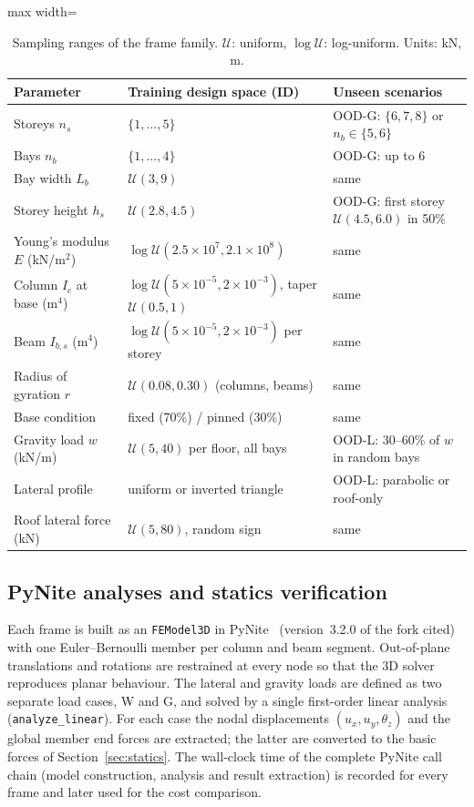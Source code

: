 \begin{table}[t]
\centering
\caption{Sampling ranges of the frame family. $\mathcal{U}$: uniform, $\log\mathcal{U}$: log-uniform. Units: kN, m.}\label{tab:ranges}
\footnotesize
\begin{adjustbox}{max width=\textwidth}
\begin{tabular}{p{3.4cm}p{5.4cm}p{4.6cm}}
\toprule
Parameter & Training design space (ID) & Unseen scenarios \\
\midrule
Storeys $n_s$ & $\{1,\dots,5\}$ & OOD-G: $\{6,7,8\}$ or $n_b\in\{5,6\}$ \\
Bays $n_b$ & $\{1,\dots,4\}$ & OOD-G: up to $6$ \\
Bay width $L_b$ & $\mathcal{U}(3,9)$ & same \\
Storey height $h_s$ & $\mathcal{U}(2.8,4.5)$ & OOD-G: first storey $\mathcal{U}(4.5,6.0)$ in 50\% \\
Young's modulus $E$ (kN/m$^2$) & $\log\mathcal{U}(2.5\times10^7, 2.1\times10^8)$ & same \\
Column $I_{c}$ at base (m$^4$) & $\log\mathcal{U}(5\times10^{-5},2\times10^{-3})$, taper $\mathcal{U}(0.5,1)$ & same \\
Beam $I_{b,s}$ (m$^4$) & $\log\mathcal{U}(5\times10^{-5},2\times10^{-3})$ per storey & same \\
Radius of gyration $r$ & $\mathcal{U}(0.08,0.30)$ (columns, beams) & same \\
Base condition & fixed (70\%) / pinned (30\%) & same \\
Gravity load $w$ (kN/m) & $\mathcal{U}(5,40)$ per floor, all bays & OOD-L: 30--60\% of $w$ in random bays \\
Lateral profile & uniform or inverted triangle & OOD-L: parabolic or roof-only \\
Roof lateral force (kN) & $\mathcal{U}(5,80)$, random sign & same \\
\bottomrule
\end{tabular}
\end{adjustbox}
\end{table}

\subsection{PyNite analyses and statics verification}
Each frame is built as an \texttt{FEModel3D} in PyNite~\cite{pynite} (version~3.2.0 of the fork cited) with one Euler--Bernoulli member per column and beam segment. Out-of-plane translations and rotations are restrained at every node so that the 3D solver reproduces planar behaviour. The lateral and gravity loads are defined as two separate load cases, W and G, and solved by a single first-order linear analysis (\texttt{analyze\_linear}). For each case the nodal displacements $(u_x,u_y,\theta_z)$ and the global member end forces are extracted; the latter are converted to the basic forces of Section~\ref{sec:statics}. The wall-clock time of the complete PyNite call chain (model construction, analysis and result extraction) is recorded for every frame and later used for the cost comparison.

